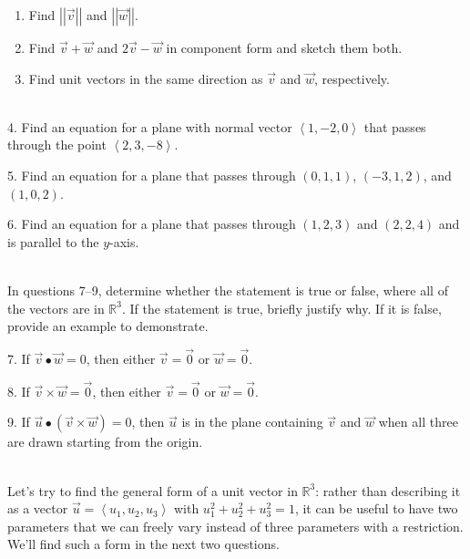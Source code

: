 \documentclass{article}
\begin{document}
\begin{enumerate}

	\item Find $\left| \left| \vec{v} \right| \right|$ and $\left| \left| \vec{w} \right| \right|$.

	\item Find $\vec{v} + \vec{w}$ and $2\vec{v} - \vec{w}$ in component form and sketch them both.

	\item Find unit vectors in the same direction as $\vec{v}$ and $\vec{w}$, respectively.

\end{enumerate}

~\\

4. Find an equation for a plane with normal vector $\left< 1, -2, 0 \right>$ that passes through the point $\left< 2, 3, -8 \right>$.

5. Find an equation for a plane that passes through $\left( 0, 1, 1 \right)$, $\left( -3, 1, 2 \right)$, and $\left( 1, 0, 2 \right)$.

6. Find an equation for a plane that passes through $\left( 1, 2, 3 \right)$ and $\left(2, 2, 4 \right)$ and is parallel to the $y$-axis.

~\\

In questions 7--9, determine whether the statement is true or false, where all of the vectors are in $\mathbb{R}^3$. If the statement is true, briefly justify why. If it is false, provide an example to demonstrate.

7. If $\vec{v} \bullet \vec{w} = 0$, then either $\vec{v} = \vec{0}$ or $\vec{w} = \vec{0}$.

8. If $\vec{v} \times \vec{w} = \vec{0}$, then either $\vec{v} = \vec{0}$ or $\vec{w} = \vec{0}$.

9. If $\vec{u} \bullet \left( \vec{v} \times \vec{w} \right) = 0$, then $\vec{u}$ is in the plane containing $\vec{v}$ and $\vec{w}$ when all three are drawn starting from the origin.

~\\

Let's try to find the general form of a unit vector in $\mathbb{R}^3$: rather than describing it as a vector $\vec{u} = \left< u_1, u_2, u_3 \right>$ with $u_1^2 + u_2^2 + u_3^2 = 1$, it can be useful to have two parameters that we can freely vary instead of three parameters with a restriction. We'll find such a form in the next two questions.
\end{document}
